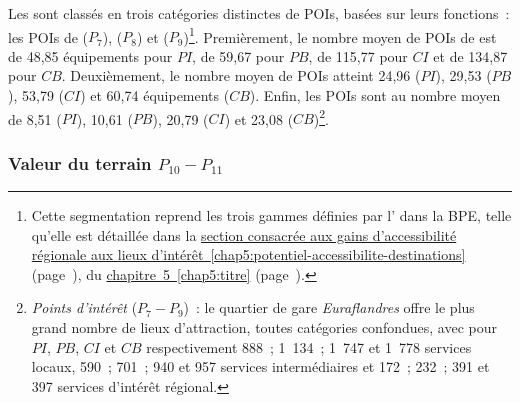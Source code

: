 \begin{refsegment}
Les  sont classés en trois catégories distinctes de \acrfull{POIs}, basées sur leurs fonctions~: les \acrshort{POIs} de  (\(P_{7}\)),  (\(P_{8}\)) et  (\(P_{9}\))\footnote{
    Cette segmentation reprend les trois gammes définies par l'\textcolor{blue}{\textcite{insee_base_2021}} dans la \acrfull{BPE}, telle qu'elle est détaillée dans la \hyperref[chap5:potentiel-accessibilite-destinations]{section consacrée aux gains d'accessibilité régionale aux lieux d'intérêt~\ref{chap5:potentiel-accessibilite-destinations}} (page~\pageref{chap5:potentiel-accessibilite-destinations}), du \hyperref[chap5:titre]{chapitre~5~\ref{chap5:titre}} (page~\pageref{chap5:titre}).
}. Premièrement, le nombre moyen de \acrshort{POIs} de  est de 48,85 équipements pour \(PI\), de 59,67 pour \(PB\), de 115,77 pour \(CI\) et de 134,87 pour \(CB\). Deuxièmement, le nombre moyen de \acrshort{POIs}  atteint 24,96 (\(PI\)), 29,53 (\(PB\)), 53,79 (\(CI\)) et 60,74 équipements (\(CB\)). Enfin, les \acrshort{POIs}  sont au nombre moyen de 8,51 (\(PI\)), 10,61 (\(PB\)), 20,79 (\(CI\)) et 23,08 (\(CB\))\footnote{
    \textsl{Points d'intérêt} (\(P_{7} - P_{9}\))~: le quartier de gare \textsl{Euraflandres} offre le plus grand nombre de lieux d'attraction, toutes catégories confondues, avec pour \(PI\), \(PB\), \(CI\) et \(CB\) respectivement 888~; 1~134~; 1~747 et 1~778 services locaux, 590~; 701~; 940 et 957 services intermédiaires et 172~; 232~; 391 et 397 services d'intérêt régional.
}.%

\subsubsection*{Valeur du terrain \(P_{10} - P_{11}\)
    \label{chap6:indicateurs-place-foncier}
    }
    

\end{refsegment}
